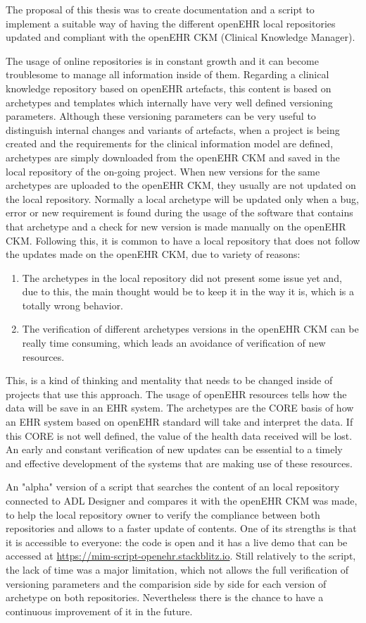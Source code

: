 \documentclass[mim_thesis.tex]{subfiles}
\begin{document}
The proposal of this thesis was to create documentation and a script to implement a suitable way of having the different openEHR local repositories updated and compliant with the openEHR CKM (Clinical Knowledge Manager).   

The usage of online repositories is in constant growth and it can become troublesome to manage all information inside of them. Regarding a clinical knowledge repository based on openEHR artefacts, this content is based on archetypes and templates which internally have very well defined versioning parameters.
Although these versioning parameters can be very useful to distinguish internal changes and variants of artefacts, when a project is being created and the requirements for the clinical information model are defined, archetypes are simply downloaded from the openEHR CKM and saved in the local repository of the on-going project. When new versions for the same archetypes are uploaded to the openEHR CKM, they usually are not updated on the local repository. Normally a local archetype will be updated only when a bug, error or new requirement is found during the usage of the software that contains that archetype and a check for new version is made manually on the openEHR CKM. Following this, it is common to have a local repository that does not follow the updates made on the openEHR CKM, due to variety of reasons: 
\begin{enumerate}[noitemsep]
\item The archetypes in the local repository did not present some issue yet and, due to this, the main thought would be to keep it in the way it is, which is a totally wrong behavior. 
\item The verification of different archetypes versions in the openEHR CKM can be really time consuming, which leads an avoidance of verification of new resources.
\end{enumerate}

This, is a kind of thinking and mentality that needs to be changed inside of projects that use this approach. The usage of openEHR resources tells how the data will be save in an EHR system. The archetypes are the CORE basis of how an EHR system based on openEHR standard will take and interpret the data. If this CORE is not well defined, the value of the health data received will be lost. An early and constant verification of new updates can be essential to a timely and effective development of the systems that are making use of these resources.

An "alpha" version of a script that searches the content of an local repository connected to ADL Designer and compares it with the openEHR CKM was made, to help the local repository owner to verify the compliance between both repositories and allows to a faster update of contents. One of its strengths is that it is accessible to everyone: the code is open and it has a live demo that can be accessed at \url{https://mim-script-openehr.stackblitz.io}. Still relatively to the script, the lack of time was a major limitation, which not allows the full verification of versioning parameters and the comparision side by side for each version of archetype on both repositories. Nevertheless there is the chance to have a continuous improvement of it in the future. 
\end{document}
